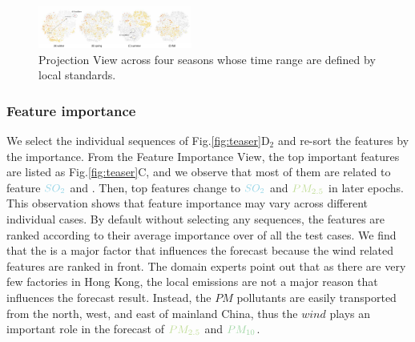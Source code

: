 
\begin{figure}[t]
	\centering
	\includegraphics[width=0.45\textwidth]{pictures/Evaluation/seasonal_behavior.pdf}
	\vspace{-3mm}
	\caption{Projection View across four seasons whose time range are defined by local standards.}
	\label{fig:seasonal_feature}
	\vspace{-4mm}
\end{figure}

\subsubsection{Feature importance}
We select the individual sequences of Fig.\ref{fig:teaser}D$_2$ and re-sort the features by the importance. 
From the Feature Importance View, the top important features are listed as Fig.\ref{fig:teaser}C, and we observe that most of them are related to feature $\color{SO2Color}{SO_{2}}$ and \textit{\color{WINDColor}{Wind Speed}}.
Then, top features change to $\color{SO2Color}{SO_2}$ and $\color{PM25Color}{PM_{2.5}}$ in later epochs. 
This observation shows that feature importance may vary across different individual cases. 
By default without selecting any sequences, the features are ranked according to their average importance over of all the test cases. 
We find that the \textit{\color{WINDColor}{Wind Speed}} is a major factor that influences the forecast because the wind related features are ranked in front.
The domain experts point out that as there are very few factories in Hong Kong, the local emissions are not a major reason that influences the forecast result. 
Instead, the $PM$ pollutants are easily transported from the north, west, and east of mainland China, thus the $wind$ plays an important role in the forecast of $\color{PM25Color}{PM_{2.5}}$ and $\color{PM10Color}{PM_{10}}$.


